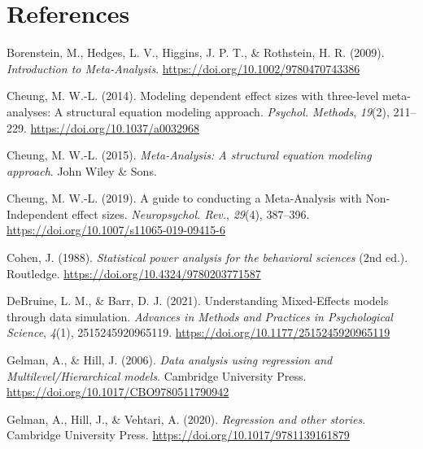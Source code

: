 \documentclass[
  man,floatsintext]{apa6}
\newlength{\cslhangindent}
\newlength{\cslentryspacingunit} %
\newenvironment{CSLReferences}[2] %
 {%
  \setlength{\parindent}{0pt}
  \ifodd #1
  \let\oldpar\par
  \def\par{\hangindent=\cslhangindent\oldpar}
  \fi
  \setlength{\parskip}{#2\cslentryspacingunit}
 }%
 {}
\begin{document}
\newpage

\hypertarget{references}{%
\section*{References}\label{references}}

\hypertarget{refs}{}
\begin{CSLReferences}{1}{0}
\leavevmode{}%
Borenstein, M., Hedges, L. V., Higgins, J. P. T., \& Rothstein, H. R. (2009). \emph{Introduction to {Meta-Analysis}}. \url{https://doi.org/10.1002/9780470743386}

\leavevmode{}%
Cheung, M. W.-L. (2014). Modeling dependent effect sizes with three-level meta-analyses: A structural equation modeling approach. \emph{Psychol. Methods}, \emph{19}(2), 211--229. \url{https://doi.org/10.1037/a0032968}

\leavevmode{}%
Cheung, M. W.-L. (2015). \emph{{Meta-Analysis}: A structural equation modeling approach}. John Wiley \& Sons.

\leavevmode{}%
Cheung, M. W.-L. (2019). A guide to conducting a {Meta-Analysis} with {Non-Independent} effect sizes. \emph{Neuropsychol. Rev.}, \emph{29}(4), 387--396. \url{https://doi.org/10.1007/s11065-019-09415-6}

\leavevmode{}%
Cohen, J. (1988). \emph{Statistical power analysis for the behavioral sciences} (2nd ed.). Routledge. \url{https://doi.org/10.4324/9780203771587}

\leavevmode{}%
DeBruine, L. M., \& Barr, D. J. (2021). Understanding {Mixed-Effects} models through data simulation. \emph{Advances in Methods and Practices in Psychological Science}, \emph{4}(1), 2515245920965119. \url{https://doi.org/10.1177/2515245920965119}

\leavevmode{}%
Gelman, A., \& Hill, J. (2006). \emph{Data analysis using regression and {Multilevel/Hierarchical} models}. Cambridge University Press. \url{https://doi.org/10.1017/CBO9780511790942}

\leavevmode{}%
Gelman, A., Hill, J., \& Vehtari, A. (2020). \emph{Regression and other stories}. Cambridge University Press. \url{https://doi.org/10.1017/9781139161879}


\end{CSLReferences}
\end{document}
